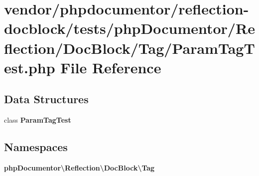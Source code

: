 \section{vendor/phpdocumentor/reflection-\/docblock/tests/php\+Documentor/\+Reflection/\+Doc\+Block/\+Tag/\+Param\+Tag\+Test.php File Reference}
\label{_param_tag_test_8php}
\subsection*{Data Structures}
\begin{DoxyCompactItemize}
\item 
class {\bf Param\+Tag\+Test}
\end{DoxyCompactItemize}
\subsection*{Namespaces}
\begin{DoxyCompactItemize}
\item 
 {\bf php\+Documentor\textbackslash{}\+Reflection\textbackslash{}\+Doc\+Block\textbackslash{}\+Tag}
\end{DoxyCompactItemize}
